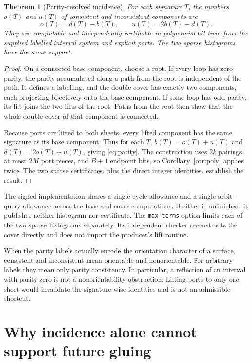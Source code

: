 \documentclass[11pt,letterpaper]{article}
\newtheorem{theorem}{Theorem}[section]
\theoremstyle{definition}
\newcommand{\code}[1]{\texttt{#1}}
\begin{document}
\begin{theorem}[Parity-resolved incidence]\label{thm:signed}
For each signature $T$, the numbers $o(T)$ and $u(T)$ of consistent and
inconsistent components are
\begin{equation}\label{eq:parity}
 o(T)=d(T)-b(T),\qquad u(T)=2b(T)-d(T).
\end{equation}
They are computable and independently certifiable in polynomial bit time
from the supplied labelled interval system and explicit ports. The two
sparse histograms have the same support.
\end{theorem}
\begin{proof}
On a connected base component, choose a root. If every loop has zero
parity, the parity accumulated along a path from the root is independent
of the path. It defines a labelling, and the double cover has exactly two
components, each projecting bijectively onto the base component. If some
loop has odd parity, its lift joins the two lifts of the root. Paths from
the root then show that the whole double cover of that component is
connected.

Because ports are lifted to both sheets, every lifted component has the
same signature as its base component. Thus for each $T$,
$b(T)=o(T)+u(T)$ and $d(T)=2o(T)+u(T)$, giving \eqref{eq:parity}. The
construction uses $2k$ pairings, at most $2M$ port pieces, and $B+1$ endpoint
bits, so Corollary~\ref{cor:poly} applies twice. The two sparse certificates,
plus the direct integer identities, establish the result.
\end{proof}

The signed implementation shares a single cycle allowance and a single
orbit-query allowance across the base and cover computations. If either
is unfinished, it publishes neither histogram nor certificate. The
\code{max\_terms} option limits each of the two sparse histograms
separately. Its independent checker reconstructs the cover directly and
does not import the producer's lift routine.

When the parity labels actually encode the orientation character of a
surface, consistent and inconsistent mean orientable and nonorientable.
For arbitrary labels they mean only parity consistency. In particular, a
reflection of an interval with parity zero is not a nonorientability
obstruction. Lifting ports to only one sheet would invalidate the
signature-wise identities and is not an admissible shortcut.

\section{Why incidence alone cannot support future gluing}\label{sec:barrier}
\end{document}
